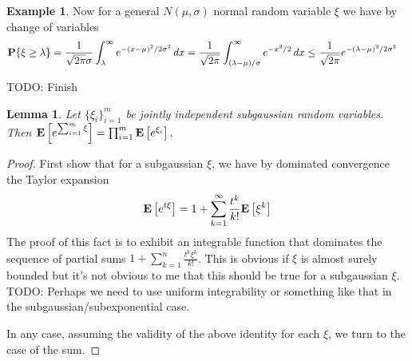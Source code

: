 \documentclass{amsart}
\newtheorem{lem}[thm]{Lemma}
\theoremstyle{remark}
\theoremstyle{definition}
\newtheorem{examp}[thm]{Example}
\begin{document}
\begin{examp}
Now for a general $N(\mu, \sigma)$ normal random variable $\xi$ we
have by change of variables
\begin{align*}
\textbf{P}\{\xi \geq \lambda\} &= 
\frac{1}{\sqrt{2\pi} \sigma} \int_\lambda^\infty e^{-(x-\mu)^2/2\sigma^2} \, dx = 
\frac{1}{\sqrt{2\pi}} \int_{(\lambda-\mu)/\sigma}^\infty e^{-x^2/2} \,
dx \leq \frac{1}{\sqrt{2\pi}} e^{-(\lambda-\mu)^2/2\sigma^2}
\end{align*}

TODO: Finish
\end{examp}

\begin{lem}Let $\{\xi_i\}_{i=1}^m$ be jointly independent subgaussian random variables.  Then $\textbf{E}\left[e^{\sum_{i=1}^m \xi}\right] =
  \prod_{i=1}^m \textbf{E}\left[e^{\xi_i}\right]$.
\end{lem}
\begin{proof}
First show that for a subgaussian $\xi$, we have by dominated
convergence the Taylor expansion 
$$\textbf{E}\left[e^{t\xi}\right] = 1 + \sum_{k=1}^\infty
\frac{t^k}{k!}\textbf{E}\left[\xi^k\right]$$
The proof of this fact is to exhibit an integrable function that
dominates the sequence of partial sums $1+\sum_{k=1}^n
\frac{t^k\xi^k}{k!}$.  This is obvious if $\xi$ is almost surely
bounded but it's not obvious to me that this should be true for a
subgaussian $\xi$.  TODO: Perhaps we need to use uniform integrability or
something like that in the subgaussian/subexponential case.

In any case, assuming the validity of the above identity for each
$\xi$, we turn to the case of the sum.
\end{proof}
\end{document}
